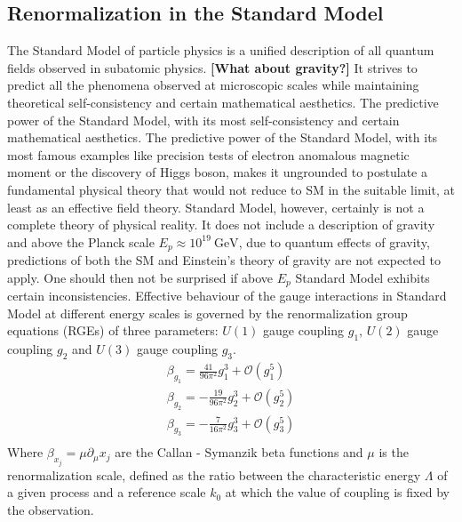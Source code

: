 \documentclass[11pt, a4paper]{article}
\newcommand{\jhkbf}[1]{\textbf{\color{red} [#1]}}
\newcommand{\jhkbf}[1]{\textbf{\color{red} [#1]}}
\begin{document}
\subsection{Renormalization in the Standard Model}
The Standard Model of particle physics is a unified description of all quantum fields observed in subatomic physics.  \jhkbf{What about gravity?}
It strives to predict all the phenomena observed at microscopic scales while maintaining theoretical
self-consistency and certain mathematical aesthetics. The predictive power of the Standard Model, with its most
self-consistency and certain mathematical aesthetics. The predictive power of the Standard Model, with its most
famous examples like precision tests of electron anomalous magnetic moment or the discovery of Higgs boson,
makes it ungrounded to postulate a fundamental physical theory that would not reduce to SM in the suitable limit, at least
as an effective field theory.
Standard Model, however, certainly is not a complete theory of physical reality. It does not include a description
of gravity and above the Planck scale $E_p \approx 10^{19} \ \text{GeV}$, due to quantum effects of gravity,
predictions of both the SM and Einstein's theory of gravity are not expected to apply.
One should then not be surprised if above $E_p$ Standard Model exhibits certain inconsistencies.
Effective behaviour of the gauge interactions in Standard Model at different energy scales is governed by the renormalization group equations (RGEs) of three parameters: $U(1)$ gauge coupling $g_1$, $U(2)$ gauge coupling $g_2$ and $U(3)$ gauge coupling $g_3$.
\begin{gather}
   \beta_{g_1} = \frac{41}{96\pi^2} g_1^3 + \mathcal{O}(g_1^5) \\%
    \beta_{g_2} = - \frac{19}{96\pi^2} g_2^3  + \mathcal{O}(g_2^5)\\
    \beta_{g_3} = - \frac{7}{16\pi^2} g_3^3 + \mathcal{O}(g_3^5) \\
\end{gather}
Where $\beta_{x_j} = \mu \partial_\mu x_j$ are the Callan - Symanzik beta functions and $\mu$ is the renormalization scale, defined as the ratio between the characteristic energy $\Lambda$ of a given process and a reference scale $k_0$ at which the value of coupling is fixed by the observation.
\end{document}
